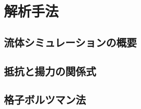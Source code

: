 \documentclass[main]{subfiles}
\begin{document}
\chapter{解析手法}

\section{流体シミュレーションの概要}


\section{抵抗と揚力の関係式}


\section{格子ボルツマン法}

\end{document}
